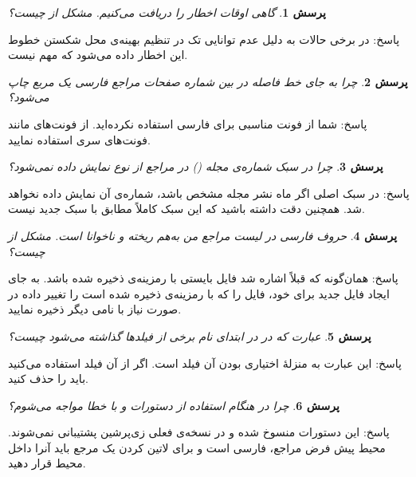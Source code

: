 \documentclass{article}
\theoremstyle{plain}\newtheorem{question}{پرسش}
\newcommand{\answer}{{\noindent \Sayeh پاسخ: }}
\newcommand\SLASH{\char`\\}
\begin{document}
\begin{question} گاهی اوقات اخطار \lr{Underfull \SLASH hbox} را دریافت می‌کنیم. مشکل از چیست؟ \end{question}
\answer در برخی حالات به دلیل عدم توانایی تک در تنظیم بهینه‌ی محل شکستن خطوط این اخطار داده می‌شود که مهم نیست.

\begin{question} چرا به جای خط فاصله در بین شماره صفحات مراجع فارسی یک مربع چاپ می‌شود؟ \end{question}
\answer شما از فونت‌ مناسبی برای فارسی استفاده نکرده‌اید. از فونت‌های مانند فونت‌های سری  استفاده نمایید. 

\begin{question} چرا در سبک   شماره‌ی مجله () در مراجع از نوع  نمایش داده نمی‌شود؟ \end{question}
\answer در سبک اصلی  اگر ماه نشر مجله مشخص باشد، شماره‌ی آن نمایش داده نخواهد شد.
 همچنین دقت داشته باشید که این سبک کاملاً مطابق با سبک جدید  نیست.

\begin{question} حروف فارسی در لیست مراجع من به‌هم ریخته و ناخوانا است. مشکل از چیست؟ \end{question}
\answer همان‌گونه که قبلاً اشاره شد فایل  بایستی با رمزینه‌ی  ذخیره شده باشد. به جای ایجاد فایل  جدید برای خود، 
فایل  را که با رمزینه‌ی  ذخیره شده است را تغییر داده در صورت نیاز با نامی دیگر ذخیره نمایید. 

\begin{question} عبارت  که در  در ابتدای نام برخی از فیلدها گذاشته می‌شود چیست؟ \end{question}
\answer این عبارت به منزله‌ٔ اختیاری بودن آن فیلد است. اگر از آن فیلد استفاده می‌کنید باید  را حذف کنید.

\begin{question} چرا در هنگام استفاده از دستورات \lr{\SLASH Persian} و \lr{\SLASH Latin} با خطا مواجه می‌شوم؟ \end{question}
\answer این دستورات منسوخ شده و در نسخه‌‌ی فعلی زی‌پرشین پشتیبانی نمی‌شوند. محیط پیش فرض مراجع، فارسی است و برای لاتین کردن یک مرجع باید آنرا داخل محیط  قرار دهید.
\end{document}

